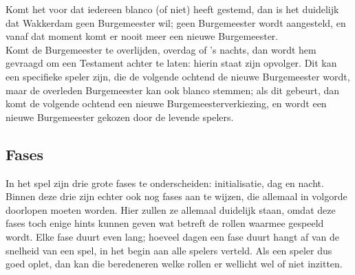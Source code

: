 \documentclass[12pt]{article}
\begin{document}
      Komt het voor dat iedereen blanco (of niet) heeft gestemd, dan is het duidelijk dat Wakkerdam geen Burgemeester wil; geen Burgemeester wordt aangesteld, en vanaf dat moment komt er nooit meer een nieuwe Burgemeester. 
      \\[\baselineskip]
      Komt de Burgemeester te overlijden, overdag of 's nachts, dan wordt hem gevraagd om een Testament achter te laten: hierin staat zijn opvolger. Dit kan een specifieke speler zijn, die de volgende ochtend de nieuwe Burgemeester wordt, maar de overleden Burgemeester kan ook blanco stemmen; als dit gebeurt, dan komt de volgende ochtend een nieuwe Burgemeesterverkiezing, en wordt een nieuwe Burgemeester gekozen door de levende spelers.

  \subsection{Fases}
  
    In het spel zijn drie grote fases te onderscheiden: initialisatie, dag en nacht. Binnen deze drie zijn echter ook nog fases aan te wijzen, die allemaal in volgorde doorlopen moeten worden. Hier zullen ze allemaal duidelijk staan, omdat deze fases toch enige hints kunnen geven wat betreft de rollen waarmee gespeeld wordt. Elke fase duurt even lang; hoeveel dagen een fase duurt hangt af van de snelheid van een spel, in het begin aan alle spelers verteld. Als een speler dus goed oplet, dan kan die beredeneren welke rollen er wellicht wel of niet inzitten.
    
\end{document}
